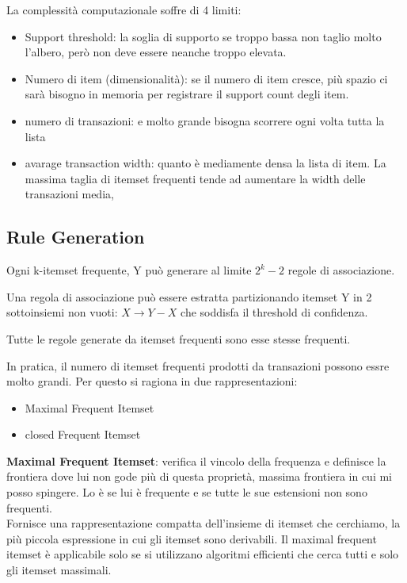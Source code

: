 La complessit\`a computazionale soffre di 4 limiti:
\begin{itemize}
	\item Support threshold: la soglia di supporto se troppo bassa non taglio molto l'albero, per\`o non deve essere neanche troppo elevata. 
	\item Numero di item (dimensionalit\`a): se il numero di item cresce, pi\`u spazio ci sar\`a bisogno in memoria per registrare il support count degli item.
	\item numero di transazioni: e molto grande bisogna scorrere ogni volta tutta la lista
	\item avarage transaction width: quanto \`e mediamente densa la lista di item. La massima taglia di itemset frequenti tende ad aumentare la width delle transazioni media,
\end{itemize}

\subsection{Rule Generation}
Ogni k-itemset frequente, Y pu\`o generare al limite $2^k-2$ regole di associazione. 

Una regola di associazione pu\`o essere estratta partizionando itemset Y in 2 sottoinsiemi non vuoti: $X \rightarrow Y -X$ che soddisfa il threshold di confidenza.

Tutte le regole generate da itemset frequenti sono esse stesse frequenti.

In pratica, il numero di itemset frequenti prodotti da transazioni possono essre molto grandi. Per questo si ragiona in due rappresentazioni:
\begin{itemize}
	\item Maximal Frequent Itemset
	\item closed Frequent Itemset
\end{itemize}

\textbf{Maximal Frequent Itemset}: verifica il vincolo della frequenza e definisce la frontiera dove lui non gode pi\`u di questa propriet\`a, massima frontiera in cui mi posso spingere. Lo \`e se lui \`e frequente e se tutte le sue estensioni non sono frequenti.\\
Fornisce una rappresentazione compatta dell'insieme di itemset che cerchiamo, la pi\`u piccola espressione in cui gli itemset sono derivabili. Il maximal frequent itemset \`e applicabile solo se si utilizzano algoritmi efficienti che cerca tutti e solo gli itemset massimali.


